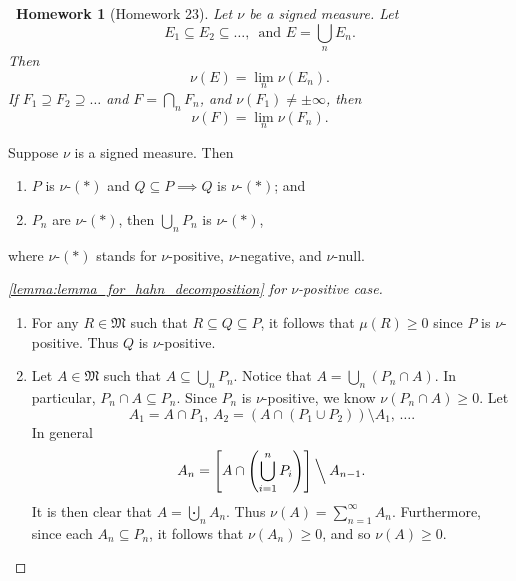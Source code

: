 \documentclass[notoc,notitlepage]{tufte-book}
\newtheorem*{homework}{\faCogs\ Homework}
\begin{document}
\begin{homework}[Homework 23]\label{homework:23}
  Let $\nu$ be a signed measure. Let
  \begin{equation*}
    E_1 \subseteq E_2 \subseteq \hdots,\, \text{ and }
    E = \bigcup_{n} E_n.
  \end{equation*}
  Then
  \begin{equation*}
    \nu(E) = \lim_{n} \nu(E_n).
  \end{equation*}
  If $F_1 \supseteq F_2 \supseteq \hdots$ and $F = \bigcap_{n} F_n$,
  and $\nu(F_1) \neq \pm \infty$, then
  \begin{equation*}
    \nu(F) = \lim_{n} \nu(F_n).
  \end{equation*}
\end{homework}

\begin{lemma}\label{lemma:lemma_for_hahn_decomposition}
  Suppose $\nu$ is a signed measure. Then
  \begin{enumerate}
    \item $P$ is $\nu$-$(*)$ and $Q \subseteq P \implies Q$ is $\nu$-$(*)$; and
    \item $P_n$ are $\nu$-$(*)$, then $\bigcup_{n} P_n$ is $\nu$-$(*)$,
  \end{enumerate}
  where $\nu$-$(*)$ stands for $\nu$-positive, $\nu$-negative, and $\nu$-null.
\end{lemma}

\begin{proof}[\cref{lemma:lemma_for_hahn_decomposition} for $\nu$-positive case]
  \begin{enumerate}
    \item For any $R \in \mathfrak{M}$ such that $R \subseteq Q \subseteq P$,
      it follows that $\mu(R) \geq 0$ since $P$ is $\nu$-positive.
      Thus $Q$ is $\nu$-positive.
    \item Let $A \in \mathfrak{M}$ such that $A \subseteq \bigcup_{n} P_n$.
      Notice that $A = \bigcup_{n} (P_n \cap A)$.
      In particular, $P_n \cap A \subseteq P_n$.
      Since $P_n$ is $\nu$-positive, we know $\nu(P_n \cap A) \geq 0$.
      Let
      \begin{equation*}
        A_1 = A \cap P_1,\, A_2 = (A \cap (P_1 \cup P_2)) \setminus A_1,\,
        \ldots.
      \end{equation*}
      In general
      \begin{equation*}
        A_n
        = \left[ A \cap \left( \bigcup_{i=1}^{n} P_i \right) \right]
          \mathbin{\Big\backslash} A_{n-1}.
      \end{equation*}
      It is then clear that $A = \bigcupdot_n A_n$.
      Thus $\nu(A) = \sum_{n=1}^{\infty} A_n$.
      Furthermore, since each $A_n \subseteq P_n$,
      it follows that $\nu(A_n) \geq 0$,
      and so $\nu(A) \geq 0$.
  \end{enumerate}
\end{proof}
\end{document}
